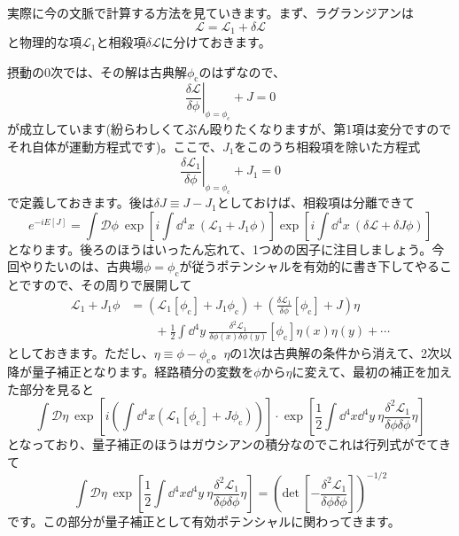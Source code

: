 \documentclass[unicode,a4paper,11pt]{ltjsarticle}
\theoremstyle{definition}
\begin{document}
実際に今の文脈で計算する方法を見ていきます。まず、ラグランジアンは
\begin{equation}
   \mathcal{L}
   =
   \mathcal{L}_{1}
   +
   \delta\mathcal{L}
\end{equation}
と物理的な項$\mathcal{L}_{1}$と相殺項$\delta\mathcal{L}$に分けておきます。

摂動の0次では、その解は古典解$\phi_{\mathrm{c}}$のはずなので、
\begin{equation}
   \left.
   \frac{\delta\mathcal{L}}{\delta\phi}
   \right|_{\phi=\phi_{\mathrm{c}}}
   +
   J
   =
   0
\end{equation}
が成立しています(紛らわしくてぶん殴りたくなりますが、第1項は変分ですのでそれ自体が運動方程式です)。ここで、$J_{1}$をこのうち相殺項を除いた方程式
\begin{equation}
   \left.
   \frac{\delta\mathcal{L}_1}{\delta\phi}
   \right|_{\phi=\phi_{\mathrm{c}}}
   +
   J_{1}
   =
   0
\end{equation}
で定義しておきます。後は$\delta J\equiv J-J_{1}$としておけば、相殺項は分離できて
\begin{equation}
   e^{-i E[J]}
   =
   \int\mathcal{D}\phi\
   \exp
   \left[
   i\int\dd^4 x\
   (\mathcal{L}_{1}+J_{1}\phi)
   \right]
   \exp
   \left[
      i\int\dd^4 x\
      (\delta\mathcal{L}+\delta J\phi)
      \right]
\end{equation}
となります。後ろのほうはいったん忘れて、1つめの因子に注目しましょう。今回やりたいのは、古典場$\phi=\phi_{\mathrm{c}}$が従うポテンシャルを有効的に書き下してやることですので、その周りで展開して
\begin{align}
   \mathcal{L}_{1}+J_{1}\phi
    & =
   \left(
   \mathcal{L}_{1}[\phi_{\mathrm{c}}]+J_{1}\phi_{\mathrm{c}}
   \right)
   +
   \left(
   \frac{\delta\mathcal{L}_{1}}{\delta\phi}[\phi_{\mathrm{c}}]
   +
   J
   \right)\eta
   \nonumber
   \\
    & \qquad
   +
   \frac{1}{2}\int\dd^4 y\
   \frac{\delta^2 \mathcal{L}_1}{\delta\phi(x)\delta\phi(y)}[\phi_{\mathrm{c}}]\eta(x)\eta(y)
   +
   \cdots
\end{align}
としておきます。ただし、$\eta\equiv\phi-\phi_{\mathrm{c}}$。$\eta$の1次は古典解の条件から消えて、2次以降が量子補正となります。経路積分の変数を$\phi$から$\eta$に変えて、最初の補正を加えた部分を見ると
\begin{equation}
   \int\mathcal{D}\eta\
   \exp
   \left[
   i
   \left(
   \int\dd^4 x (\mathcal{L}_{1}[\phi_{\mathrm{c}}]+J\phi_{\mathrm{c}})
   \right)
   \right]
   \cdot
   \exp
   \left[
      \frac{1}{2}
      \int\dd^4 x\dd^4 y\
      \eta\frac{\delta^2\mathcal{L}_{1}}{\delta\phi\delta\phi}\eta
      \right]
\end{equation}
となっており、量子補正のほうはガウシアンの積分なのでこれは行列式がでてきて
\begin{equation}
   \int\mathcal{D}\eta\
   \exp
   \left[
      \frac{1}{2}
      \int\dd^4 x\dd^4 y\
      \eta\frac{\delta^2\mathcal{L}_{1}}{\delta\phi\delta\phi}\eta
      \right]
   =
   \left(
   \mathrm{det\ }
   \left[
      -\frac{\delta^2\mathcal{L}_{1}}{\delta\phi\delta\phi}
      \right]
   \right)^{-1/2}
\end{equation}
です。この部分が量子補正として有効ポテンシャルに関わってきます。
\end{document}

